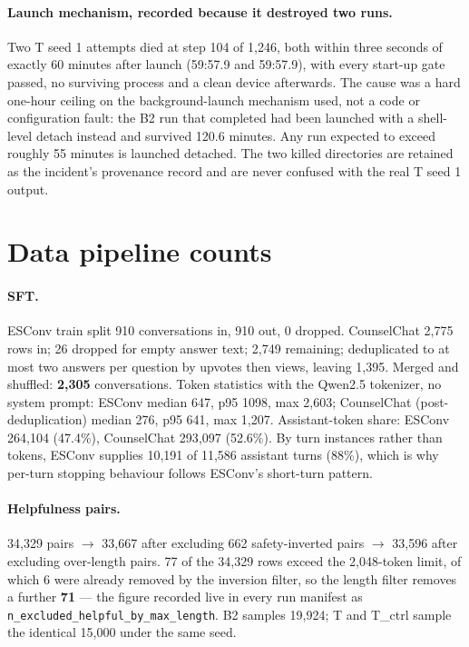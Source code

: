 \paragraph{Launch mechanism, recorded because it destroyed two runs.} Two T seed 1 attempts
died at step 104 of 1{,}246, both within three seconds of exactly 60 minutes after launch
(59:57.9 and 59:57.9), with every start-up gate passed, no surviving process and a clean
device afterwards. The cause was a hard one-hour ceiling on the background-launch mechanism
used, not a code or configuration fault: the B2 run that completed had been launched with a
shell-level detach instead and survived 120.6 minutes. Any run expected to exceed roughly 55
minutes is launched detached. The two killed directories are retained as the incident's
provenance record and are never confused with the real T seed 1 output.

\section{Data pipeline counts}
\label{app:datacounts}

\paragraph{SFT.} ESConv train split 910 conversations in, 910 out, 0 dropped. CounselChat
2{,}775 rows in; 26 dropped for empty answer text; 2{,}749 remaining; deduplicated to at
most two answers per question by upvotes then views, leaving 1{,}395. Merged and shuffled:
\textbf{2{,}305} conversations. Token statistics with the Qwen2.5 tokenizer, no system
prompt: ESConv median 647, p95 1098, max 2{,}603; CounselChat (post-deduplication) median
276, p95 641, max 1{,}207. Assistant-token share: ESConv 264{,}104 (47.4\%), CounselChat
293{,}097 (52.6\%). By turn instances rather than tokens, ESConv supplies 10{,}191 of
11{,}586 assistant turns (88\%), which is why per-turn stopping behaviour follows ESConv's
short-turn pattern.

\paragraph{Helpfulness pairs.} 34{,}329 pairs $\rightarrow$ 33{,}667 after excluding 662
safety-inverted pairs $\rightarrow$ 33{,}596 after excluding over-length pairs. 77 of the
34{,}329 rows exceed the 2{,}048-token limit, of which 6 were already removed by the
inversion filter, so the length filter removes a further \textbf{71} --- the figure recorded
live in every run manifest as \texttt{n\_excluded\_helpful\_by\_max\_length}. B2 samples
19{,}924; T and T\_ctrl sample the identical 15{,}000 under the same seed.

